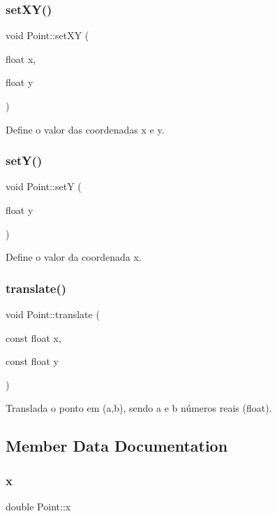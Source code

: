 \subsubsection{\texorpdfstring{set\+X\+Y()}{setXY()}}
{\footnotesize\ttfamily void Point\+::set\+XY (\begin{DoxyParamCaption}\item[{float}]{x,  }\item[{float}]{y }\end{DoxyParamCaption})}

Define o valor das coordenadas x e y. \mbox{\label{class_point_a0a9d3529888cd2fd7c0adb8e46702110}} 
\subsubsection{\texorpdfstring{set\+Y()}{setY()}}
{\footnotesize\ttfamily void Point\+::setY (\begin{DoxyParamCaption}\item[{float}]{y }\end{DoxyParamCaption})}

Define o valor da coordenada x. \mbox{\label{class_point_a2b103de4d519cd01c9864167e12d2c7f}} 
\subsubsection{\texorpdfstring{translate()}{translate()}}
{\footnotesize\ttfamily void Point\+::translate (\begin{DoxyParamCaption}\item[{const float}]{x,  }\item[{const float}]{y }\end{DoxyParamCaption})}

Translada o ponto em (a,b), sendo a e b números reais (float). 

\subsection{Member Data Documentation}
\mbox{\label{class_point_ab99c56589bc8ad5fa5071387110a5bc7}} 
\subsubsection{\texorpdfstring{x}{x}}
{\footnotesize\ttfamily double Point\+::x\hspace{0.3cm}{\ttfamily [protected]}}

